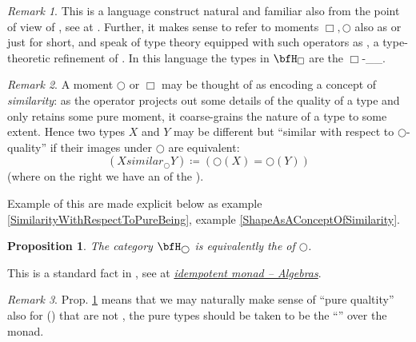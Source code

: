 \documentclass[12pt,titlepage]{article}
\theoremstyle{plain}
\newtheorem{prop}{Proposition}
\theoremstyle{definition}
\theoremstyle{remark}
\newtheorem{remark}{Remark}
\begin{document}
\begin{remark}
\label{}\hypertarget{}{}
This is a language construct natural and familiar also from the point of view of , see at .
Further, it makes sense to refer to moments $\Box,\bigcirc$ also as  or just  for short, and speak of type theory equipped with such operators as , a type-theoretic refinement of . In this language the types in $\bfH_{\Box}$ are the $\Box$-\_\_.
\end{remark}
\begin{remark}
\label{MomentsAndSimilarity}\hypertarget{MomentsAndSimilarity}{}
A moment $\bigcirc$ or $\Box$ may be thought of as encoding a concept of \emph{similarity}: as the operator projects out some details of the quality of a type and only retains some pure moment, it coarse-grains the nature of a type to some extent. Hence two types $X$ and $Y$ may be different but ``similar with respect to $\bigcirc$-quality'' if their images under $\bigcirc$ are equivalent:
\begin{displaymath}
(X similar_{\bigcirc} Y)
\coloneqq
(\bigcirc(X) =  \bigcirc(Y))
\end{displaymath}
(where on the right we have an  of the ).
\end{remark}
Example of this are made explicit below as example \ref{SimilarityWithRespectToPureBeing}, example \ref{ShapeAsAConceptOfSimilarity}.
\begin{prop}
\label{bigcircpureObjectsAreEMObjects}\hypertarget{bigcircpureObjectsAreEMObjects}{}
The category $\bfH_{\bigcirc}$ is equivalently the  of $\bigcirc$.
\end{prop}
This is a standard fact in , see at \emph{\href{idempotent+monad#AlgebrasForAnIdempotentMonad}{idempotent monad -- Algebras}}.
\begin{remark}
\label{PurityForNonIdempotent}\hypertarget{PurityForNonIdempotent}{}
Prop. \ref{bigcircpureObjectsAreEMObjects} means that we may naturally make sense of ``pure qualtity'' also for () that are not , the pure types should be taken to be the ``'' over the monad.
\end{remark}
\end{document}
